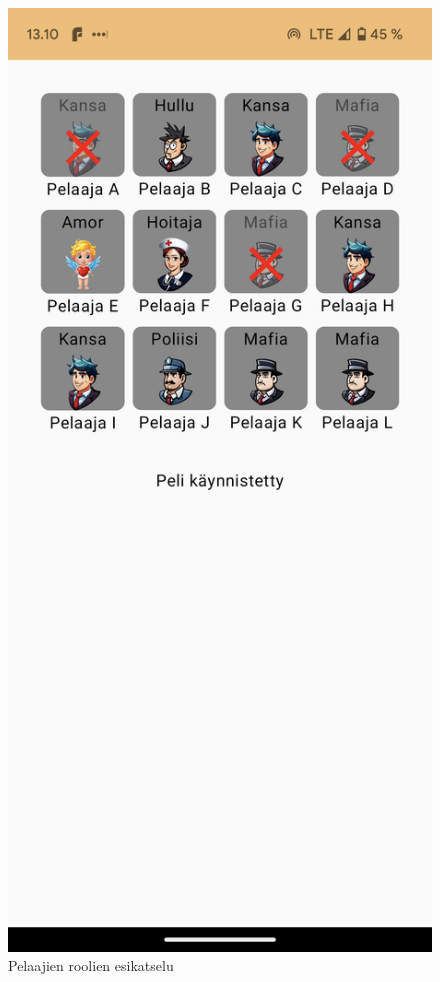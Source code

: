 \begin{figure}[h!]
\begin{minipage}[t]{.3\textwidth}
            \caption{Pelaajien roolien esikatselu}
            \label{fig:screenshot-card-details}
      \end{minipage}
      \begin{minipage}[t]{.3\textwidth}
            \includegraphics[width=\textwidth]{figures/screenshot-game-running.png}

\end{minipage}
\end{figure}
